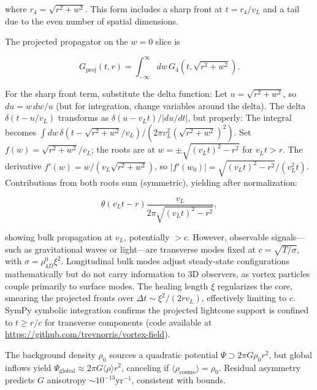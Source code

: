 where $r_4 = \sqrt{r^2 + w^2}$. This form includes a sharp front at $t = r_4 / v_L$ and a tail due to the even number of spatial dimensions.

The projected propagator on the $w=0$ slice is

\begin{equation}
G_{\text{proj}}(t, r) = \int_{-\infty}^{\infty} dw \, G_4(t, \sqrt{r^2 + w^2}).
\end{equation}

For the sharp front term, substitute the delta function: Let $u = \sqrt{r^2 + w^2}$, so $du = w \, dw / u$ (but for integration, change variables around the delta). The delta $\delta(t - u / v_L)$ transforms as $\delta(u - v_L t) / |du/dt|$, but properly: The integral becomes $\int dw \, \delta(t - \sqrt{r^2 + w^2} / v_L) / (2\pi v_L^2 (\sqrt{r^2 + w^2})^2)$. Set $f(w) = \sqrt{r^2 + w^2} / v_L$; the roots are at $w = \pm \sqrt{(v_L t)^2 - r^2}$ for $v_L t > r$. The derivative $f'(w) = w / (v_L \sqrt{r^2 + w^2})$, so $|f'(w_0)| = \sqrt{(v_L t)^2 - r^2} / (v_L^2 t)$. Contributions from both roots sum (symmetric), yielding after normalization:

\begin{equation}
\theta(v_L t - r) \frac{v_L}{2\pi \sqrt{(v_L t)^2 - r^2}},
\end{equation}

showing bulk propagation at $v_L$, potentially $>c$. However, observable signals---such as gravitational waves or light---are transverse modes fixed at $c = \sqrt{T / \sigma}$, with $\sigma = \rho_{4D}^0 \xi^2$. Longitudinal bulk modes adjust steady-state configurations mathematically but do not carry information to 3D observers, as vortex particles couple primarily to surface modes. The healing length $\xi$ regularizes the core, smearing the projected fronts over $\Delta t \sim \xi^2 / (2 r v_L)$, effectively limiting to $c$. SymPy symbolic integration confirms the projected lightcone support is confined to $t \geq r / c$ for transverse components (code available at \url{https://github.com/trevnorris/vortex-field}).

The background density $\rho_0$ sources a quadratic potential $\Psi \supset 2\pi G \rho_0 r^2$, but global inflows yield $\Psi_{\text{global}} \approx 2\pi G \langle \rho \rangle r^2$, canceling if $\langle \rho_{\text{cosmo}} \rangle = \rho_0$. Residual asymmetry predicts $G$ anisotropy $\sim 10^{-13} \text{yr}^{-1}$, consistent with bounds.

\medskip
\noindent
{}
\medskip

